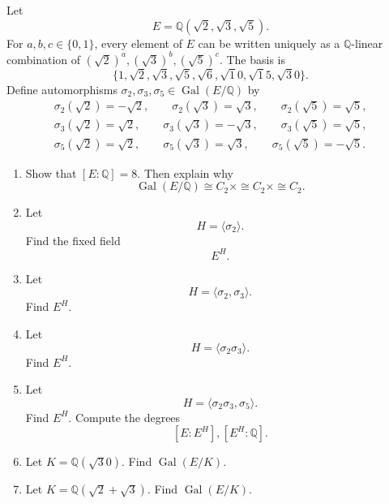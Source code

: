 \begin{prob}
    Let 
    \[
        E = \mathbb Q(\sqrt 2, \sqrt 3, \sqrt 5).
    \]
    For $a,b,c \in \{0,1\}$, every element of $E$ 
    can be written uniquely as a $\mathbb Q$-linear 
    combination of $(\sqrt 2)^a, (\sqrt 3)^b, (\sqrt 5)^c$. 
    The basis is 
    \[
        \{1,\sqrt 2, \sqrt 3, \sqrt 5, \sqrt 6, \sqrt 10, \sqrt 15, \sqrt 30\}.
    \]
    Define automorphisms $\sigma_2,\sigma_3,\sigma_5\in 
    \operatorname{Gal}(E/\mathbb Q)$ by 
    \begin{align*}
        \sigma_2(\sqrt2)=-\sqrt2,\qquad \sigma_2(\sqrt3)=\sqrt3,\qquad \sigma_2(\sqrt5)=\sqrt5, \\ 
        \sigma_3(\sqrt2)=\sqrt2,\qquad \sigma_3(\sqrt3)=-\sqrt3,\qquad \sigma_3(\sqrt5)=\sqrt5, \\ 
        \sigma_5(\sqrt2)=\sqrt2,\qquad \sigma_5(\sqrt3)=\sqrt3,\qquad \sigma_5(\sqrt5)=-\sqrt5.
    \end{align*}

    \begin{enumerate}[label=\alph*)]
        \item Show that $[E:\mathbb Q] = 8$. 
            Then explain why 
            \[
                \operatorname{Gal}(E/\mathbb Q) 
                \cong C_2 \times \cong C_2 \times \cong C_2.
            \]
        \item Let 
            \[
                H = \langle \sigma_2 \rangle.
            \]
            Find the fixed field 
            \[
                E^H.
            \]
        \item Let 
            \[
                H = \langle \sigma_2, \sigma_3 \rangle. 
            \]
            Find $E^H$.
        \item Let 
            \[
                H = \langle \sigma_2 \sigma_3\rangle. 
            \]
            Find $E^H$.
        \item Let 
            \[
                H = \langle \sigma_2\sigma_3, \sigma_5 \rangle.
            \]
            Find $E^H$.
            Compute the degrees 
            \[
                [E:E^H], [E^H : \mathbb Q].
            \]
        \item Let $K = \mathbb Q(\sqrt 30)$. Find 
            $\operatorname{Gal}(E/K)$. 
        \item Let $K = \mathbb Q(\sqrt 2 + \sqrt 3)$. 
            Find $\operatorname{Gal}(E/K)$.
    \end{enumerate}
\end{prob}

